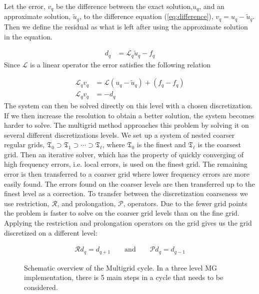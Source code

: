 	Let the error, \(v_q\) be the difference between the exact solution,\(u_q\), and an approximate
	solution, \(\tilde{u}_q\), to the difference equation (\ref{eq:difference}), \( v_q = u_q - \tilde{u}_q \).
	Then we define the residual as what is left after using the approximate solution
	in the equation.

	\begin{align}
		d_q &= \mathcal{L}_q \tilde{u}_q - f_q
	\end{align}
	Since \(\mathcal{L}\) is a linear operator the error satisfies the following relation

	\begin{align}
		\mathcal{L}_q v_q &= \mathcal{L}(u_q - \tilde{u}_q)  + (f_q- f_q)
		\\
		\mathcal{L}_q v_q &= - d_q \label{eq:diff_MG}
	\end{align}
	The system can then be solved directly on this level with a chosen discretization.
	If we then increase the resolution to obtain a better solution, the system
	becomes harder to solve. The multigrid method approaches this problem
	by solving it on several different discretizations levels.
	We set up a system of nested coarser regular grids,
	\(\mathfrak{T}_0 \supset \mathfrak{T}_{1} \supset \cdots \supset \mathfrak{T}_\ell\),
	where \(\mathfrak{T}_0\) is the finest and \(\mathfrak{T}_\ell\) is the coarsest grid.
	Then an iterative solver, which has the property of quickly converging of high frequency errors, i.e.
	local errors, is used on the finest grid. The remaining error is then transferred
	to a coarser grid where lower frequency errors are more easily found. The errors
	found on the coarser levels are then transferred up to the finest level as a correction.
	To transfer between the discretization coarseness we use restriction, \( \mathcal{R} \),
	and prolongation, \( \mathcal{P} \), operators. Due to the fewer grid points the problem is
	faster to solve on the coarser grid levels than on the fine grid.
	Applying the restriction and prolongation operators on the grid gives us
	the grid discretized on a different level:

	\begin{align}
		\mathcal{R} d_q = d_{q+1} \qquad \text{and} \qquad \mathcal{P} d_q = d_{q - 1}
	\end{align}

	\begin{figure}
	    \center
		
		\caption{Schematic overview of the Multigrid cycle. In a three level MG implementation,
		there is 5 main steps in a cycle that needs to be considered.}
		\label{fig:MG_schematic}
	\end{figure}

